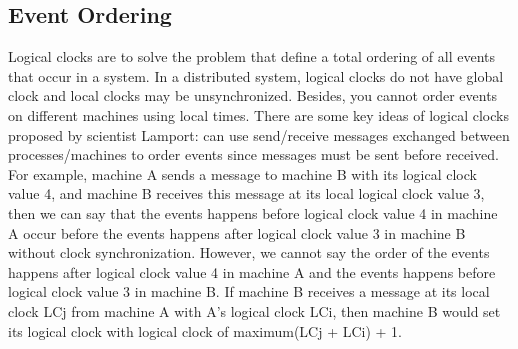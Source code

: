 \documentclass[twoside]{article}
\begin{document}
\subsection{Event Ordering}
Logical clocks are to solve the problem that define a total ordering of all events that occur in a system. In a distributed system, logical clocks do not have global clock and local clocks may be unsynchronized. Besides, you cannot order events on different machines using local times. There are some key ideas of logical clocks proposed by scientist Lamport: can use send/receive messages exchanged between processes/machines to order events since messages must be sent before received.\\

For example, machine A sends a message to machine B with its logical clock value 4, and machine B receives this message at its local logical clock value 3, then we can say that the events happens before logical clock value 4 in machine A occur before the events happens after logical clock value 3 in machine B without clock synchronization. However, we cannot say the order of the events happens after logical clock value 4 in machine A and the events happens before logical clock value 3 in machine B. If machine B receives a message at its local clock LCj from machine A with A’s logical clock LCi, then machine B would set its logical clock with logical clock of maximum(LCj + LCi) + 1.
\end{document}
